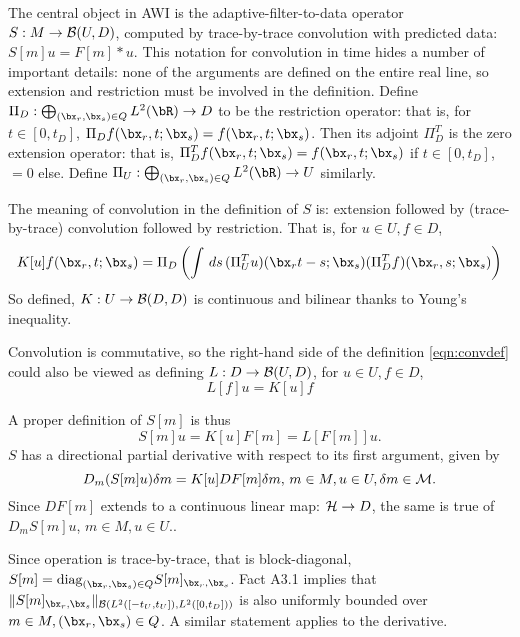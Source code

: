The central object in AWI is the adaptive-filter-to-data operator $S:
M \rightarrow {\cal B}(U,D)$, computed by trace-by-trace convolution
with predicted data: $S[m]u = F[m] * u$.
This notation for convolution in time hides a number of important details: none of the arguments are defined on the entire real line, so extension and restriction must be involved in the definition. Define $\Pi_D: \bigoplus_{(\bx_r,\bx_s) \in Q} L^2(\bR) \rightarrow D$ to be the restriction operator: that is, for $t \in [0,t_D]$, $\Pi_Df(\bx_r,t;\bx_s) = f(\bx_r,t;\bx_s)$. Then its adjoint $\Pi_D^T$ is the zero extension operator: that is, $\Pi_D^Tf(\bx_r,t;\bx_s) = f(\bx_r,t;\bx_s)$ if $t \in [0,t_D]$, $= 0$ else. Define $\Pi_U:  \bigoplus_{(\bx_r,\bx_s) \in Q} L^2(\bR) \rightarrow U$ similarly.

The meaning of convolution in the definition of $S$ is: extension followed by (trace-by-trace) convolution followed by restriction. That is, for $u \in U, f \in D$,
\begin{equation}
  \label{eqn:convdef}
  K[u]f(\bx_r,t;\bx_s) = \Pi_D\left(\int\,ds\,(\Pi_U^Tu)(\bx_rt-s;\bx_s) (\Pi_D^Tf)(\bx_r,s;\bx_s)\right)
\end{equation}
So defined, $K:U \rightarrow {\cal B}(D,D)$ is continuous and bilinear thanks to Young's inequality.

Convolution is commutative, so the right-hand side of the definition \ref{eqn:convdef} could also be viewed as defining $L: D \rightarrow {\cal B}(U,D)$, for $u \in U, f \in D$,
\begin{equation}
  \label{eqn:altconvdef}
  L[f]u = K[u]f
\end{equation}

A proper definition of $S[m]$ is thus
\begin{equation}
  \label{eqn:sdef}
  S[m]u = K[u]F[m] = L[F[m]]u.
\end{equation}
$S$ has a directional partial derivative with respect to its first argument, given by
\begin{equation}
  \label{eqn:dsdef}
  D_m(S[m]u) \delta m = K[u]DF[m] \delta m,\,m\in M, u \in U, \delta m \in {\cal M}.
\end{equation}
Since $DF[m]$ extends to a continuous linear map: ${\cal H} \rightarrow D$, the same is true of $D_mS[m]u$, $m \in M, u \in U$..

Since operation is trace-by-trace, that is block-diagonal, $S[m] = \mbox{diag}_{(\bx_r,\bx_s) \in Q}S[m]_{\bx_r,\bx_s}$. Fact A3.1 implies that $\|S[m]_{\bx_r,\bx_s}\|_{{\cal B}(L^2([-t_U,t_U]),L^2([0,t_D]))}$ is also uniformly bounded over $m \in M, (\bx_r,\bx_s) \in Q$. A similar statement applies to the derivative.

